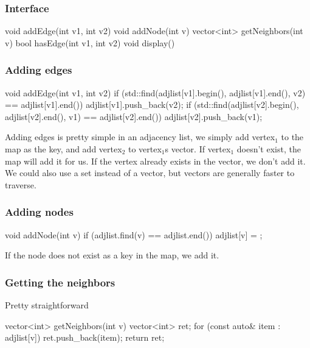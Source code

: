 \documentclass{report}
\begin{document}
\subsubsection{Interface}
\bigbreak \noindent 
\begin{cppcode}
   void addEdge(int v1, int v2) {}
   void addNode(int v) {}
   vector<int> getNeighbors(int v) {}
   bool hasEdge(int v1, int v2) {}
   void display() {}
\end{cppcode}

\bigbreak \noindent 
\subsubsection{Adding edges}
\bigbreak \noindent 
\begin{cppcode}
    void addEdge(int v1, int v2) {
        if (std::find(adjlist[v1].begin(), adjlist[v1].end(), v2) == adjlist[v1].end()) {
            adjlist[v1].push_back(v2);
        }
        if (std::find(adjlist[v2].begin(), adjlist[v2].end(), v1) == adjlist[v2].end()) {
            adjlist[v2].push_back(v1);
        }
    }
\end{cppcode}
\bigbreak \noindent 
Adding edges is pretty simple in an adjacency list, we simply add vertex$_{1}$ to the map as the key, and add vertex$_{2}$ to vertex$_1$s vector. If vertex$_1$ doesn't exist, the map will add it for us. If the vertex already exists in the vector, we don't add it.
\bigbreak \noindent 
We could also use a set instead of a vector, but vectors are generally faster to traverse.

\bigbreak \noindent 
\subsubsection{Adding nodes}
\bigbreak \noindent 
\begin{cppcode}
    void addNode(int v) {
        if (adjlist.find(v) == adjlist.end()) {
            adjlist[v] = {};
        }
    }
\end{cppcode}
\bigbreak \noindent 
If the node does not exist as a key in the map, we add it.

\bigbreak \noindent 
\subsubsection{Getting the neighbors}
Pretty straightforward
\bigbreak \noindent 
\begin{cppcode}
    vector<int> getNeighbors(int v) {
        vector<int> ret{};
        for (const auto& item : adjlist[v]) {
            ret.push_back(item);
        }
        return ret;
    }
\end{cppcode}
\end{document}
